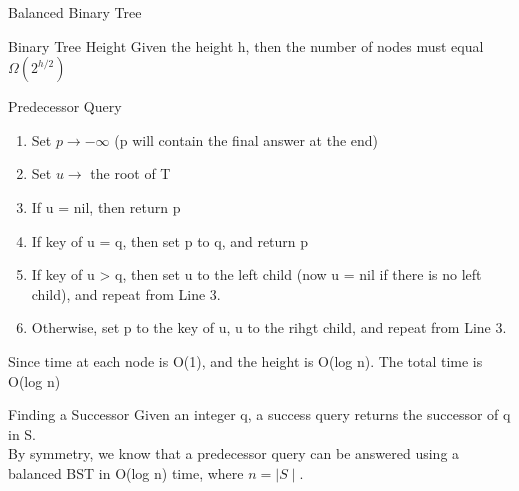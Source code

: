 \documentclass{lecture}
\begin{document}
\begin{landscape}
\begin{multicols}{2}
\begin{note}{Balanced Binary Tree}
    \end{note}
    \vfill
    \begin{note}{Binary Tree Height}
        Given the height h, then the number of nodes must equal $\Omega(2^{h/2})$
    \end{note}
    \vfill
    \begin{note}{Predecessor Query}
        \begin{enumerate}[nolistsep]
            \item Set $p\rightarrow -\infty$ (p will contain the final answer at the end)
            \item Set $u\rightarrow$ the root of T
            \item If u = nil, then return p
            \item If key of u = q, then set p to q, and return p
            \item If key of u > q, then set u to the left child (now u = nil if there is no left child), and repeat from Line 3.
            \item Otherwise, set p to the key of u, u to the rihgt child, and repeat from Line 3.
        \end{enumerate}
        Since time at each node is O(1), and the height is O(log n). The total time is O(log n)
    \end{note}
    \vfill
    \begin{note}{Finding a Successor}
        Given an integer q, a success query returns the successor of q in S.\\
        By symmetry, we know that a predecessor query can be answered using a balanced BST in O(log n) time, where $n=\mid S\mid$.
    \end{note}

\end{multicols}

\end{landscape}
\end{document}
